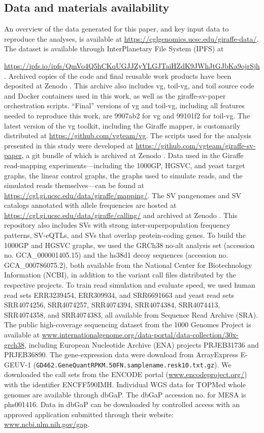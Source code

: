 \documentclass[11pt]{ucscthesis}
\begin{document}
\subsection{Data and materials availability}
\label{sec:aim2:code-data}
An overview of the data generated for this paper, and key input data to reproduce the analyses, is available at \url{https://cglgenomics.ucsc.edu/giraffe-data/}.
The dataset is available through InterPlanetary File System (IPFS) at \raggedright{\url{https://ipfs.io/ipfs/QmVo4Q5hCKqUGJJZyYLGJTaiHZdK9JWhJtGJbKa9ojrSjh}}.
Archived copies of the code and final reusable work products have been deposited at Zenodo \cite{zenodocode}.
This archive also includes vg, toil-vg, and toil source code and Docker containers used in this work, as well as the giraffe-sv-paper orchestration scripts.
“Final” versions of vg and toil-vg, including all features needed to reproduce this work, are 9907ab2 for vg and 99101f2 for toil-vg.
The latest version of the vg toolkit, including the Giraffe mapper, is customarily distributed at \url{https://github.com/vgteam/vg}.
The scripts used for the analysis presented in this study were developed at \url{https://github.com/vgteam/giraffe-sv-paper}, a git bundle of which is archived at Zenodo \cite{zenodocode}.
Data used in the Giraffe read-mapping experiments—including the 1000GP, HGSVC, and yeast target graphs, the linear control graphs, the graphs used to simulate reads, and the simulated reads themselves—can be found at \url{https://cgl.gi.ucsc.edu/data/giraffe/mapping/}.
The SV pangenomes and SV catalogs annotated with allele frequencies are hosted at 
\url{https://cgl.gi.ucsc.edu/data/giraffe/calling/} and archived at Zenodo \cite{zenodocode}.
This repository also includes SVs with strong inter-superpopulation frequency patterns, SV-eQTLs, and SVs that overlap protein-coding genes.
To build the 1000GP and HGSVC graphs, we used the GRCh38 no-alt analysis set (accession no. GCA\_000001405.15) and the hs38d1 decoy sequences (accession no. GCA\_000786075.2), both available from the National Center for Biotechnology Information (NCBI), in addition to the variant call files distributed by the respective projects. To train read simulation and evaluate speed, we used human read sets ERR3239454, ERR309934, and SRR6691663 and yeast read sets SRR4074256, SRR4074257, SRR4074394, SRR4074384, SRR4074413, SRR4074358, and SRR4074383, all available from Sequence Read Archive (SRA).
The public high-coverage sequencing dataset from the 1000 Genomes Project \cite{1000gp_nygc_2021} is available at \url{www.internationalgenome.org/data-portal/data-collection/30x-grch38}, including European Nucleotide Archive (ENA) projects PRJEB31736 and PRJEB36890.
The gene-expression data were download from ArrayExpress E-GEUV-1 (\texttt{GD462.GeneQuantRPKM.50FN.samplename.resk10.txt.gz}).
We downloaded the call sets from the ENCODE portal \cite{sloan_encode_2016} (\url{www.encodeproject.org/}) with the identifier ENCFF590IMH.
Individual WGS data for TOPMed whole genomes are available through dbGaP.
The dbGaP accession no. for MESA is phs001416.
Data in dbGaP can be downloaded by controlled access with an approved application submitted through their website: \url{www.ncbi.nlm.nih.gov/gap}.
\end{document}
